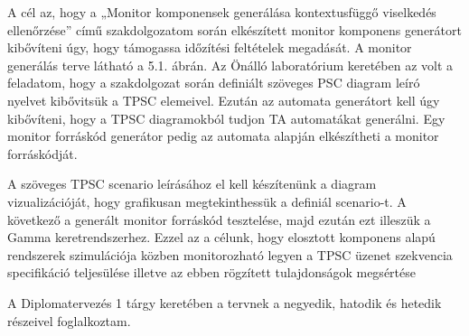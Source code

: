 A cél az, hogy a „Monitor komponensek generálása kontextusfüggő viselkedés ellenőrzése” című szakdolgozatom során elkészített monitor komponens generátort kibővíteni úgy, hogy támogassa időzítési feltételek megadását.
A monitor generálás terve látható a 5.1. ábrán.
Az Önálló laboratórium keretében az volt a feladatom, hogy a szakdolgozat során definiált szöveges PSC diagram leíró nyelvet kibővitsük a TPSC elemeivel.
Ezután az automata generátort kell úgy kibővíteni, hogy a TPSC diagramokból tudjon TA automatákat generálni.
Egy monitor forráskód generátor pedig az automata alapján elkészítheti a monitor forráskódját.

A szöveges TPSC scenario leírásához el kell készítenünk a diagram vizualizációját, hogy grafikusan megtekinthessük a definiál scenario-t.
A következő a generált monitor forráskód tesztelése, majd ezután ezt illeszük a Gamma keretrendszerhez.
Ezzel az a célunk, hogy elosztott komponens alapú rendszerek szimulációja közben monitorozható legyen a TPSC üzenet szekvencia specifikáció teljesülése illetve az ebben rögzített tulajdonságok megsértése

A Diplomatervezés 1 tárgy keretében a tervnek a negyedik, hatodik és hetedik részeivel foglalkoztam.
